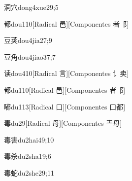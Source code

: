 \begin{verbete}{洞穴}{dong4xue2}{9;5}
\end{verbete}

\begin{verbete}{都}{dou1}{10}[Radical 邑][Componentes 者⻏]
\end{verbete}

\begin{verbete}{豆荚}{dou4jia2}{7;9}
\end{verbete}

\begin{verbete}{豆角}{dou4jiao3}{7;7}
\end{verbete}

\begin{verbete}{读}{dou4}{10}[Radical 言][Componentes ⻈卖]
\end{verbete}

\begin{verbete}{都}{du1}{10}[Radical 邑][Componentes 者⻏]
\end{verbete}

\begin{verbete}{嘟}{du1}{13}[Radical ⼝][Componentes ⼝都]
\end{verbete}

\begin{verbete}{毒}{du2}{9}[Radical ⺟][Componentes 龶⺟]
\end{verbete}

\begin{verbete}{毒害}{du2hai4}{9;10}
\end{verbete}

\begin{verbete}{毒杀}{du2sha1}{9;6}
\end{verbete}

\begin{verbete}{毒蛇}{du2she2}{9;11}
\end{verbete}


